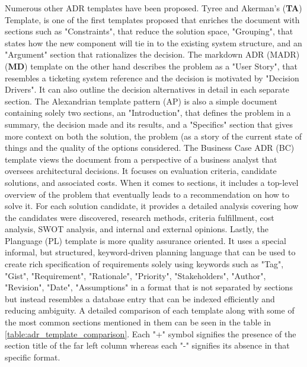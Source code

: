         Numerous other ADR templates have been proposed. Tyree and Akerman's (\textbf{TA}) Template, is one of the first templates proposed that enriches the document with sections such as "Constraints", that reduce the solution space, "Grouping", that states how the new component will tie in to the existing system structure, and an "Argument" section that rationalizes the decision. The markdown ADR (MADR) (\textbf{MD}) template\cite{MarkdownADRs} on the other hand describes the problem as a "User Story", that resembles a ticketing system reference and the decision is motivated by "Decision Drivers". It can also outline the decision alternatives in detail in each separate section. The Alexandrian template pattern (AP) is also a simple document containing solely two sections, an "Introduction", that defines the problem in a summary, the decision made and its results, and a "Specifics" section that gives more context on both the solution, the problem (as a story of the current state of things and the quality of the options considered. The Business Case ADR (BC) template views the document from a perspective of a business analyst that oversees architectural decisions. It focuses on evaluation criteria, candidate solutions, and associated costs. When it comes to sections, it includes a top-level overview of the problem that eventually leads to a recommendation on how to solve it. For each solution candidate, it provides a detailed analysis covering how the candidates were discovered, research methods, criteria fulfillment, cost analysis, SWOT analysis, and internal and external opinions. Lastly, the Planguage (PL) template is more quality assurance oriented. It uses a special informal, but structured, keyword-driven
        planning language that can be used to create rich specification of requirements solely using keywords such as "Tag", "Gist", "Requirement", "Rationale", "Priority", "Stakeholders",  "Author", "Revision", "Date", "Assumptions" in a format that is not separated by sections but instead resembles a database entry that can be indexed efficiently and reducing ambiguity. A detailed comparison of each template along with some of the most common sections mentioned in them can be seen in the table in \ref{table:adr_template_comparison}. Each "+" symbol signifies the presence of the section title of the far left column whereas each "-" signifies its absence in that specific format.  
    
